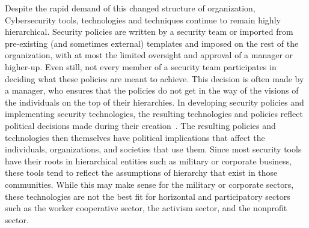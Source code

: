 
Despite the rapid demand of this changed structure of organization, 
Cybersecurity tools, technologies and techniques continue to remain highly 
hierarchical. Security policies are written by a security team or imported from
pre-existing (and sometimes external) templates and imposed on the rest of the
organization, with at most the limited oversight and approval of a manager or
higher-up. Even still, not every member of a security team participates
in deciding what these policies are meant to achieve. This decision is often
made by a manager, who ensures that the policies do not get in the way of the
visions of the individuals on the top of their hierarchies. In developing
security policies and implementing security technologies, the resulting
technologies and policies reflect political decisions made during their
creation~\cite{winner1980artifacts}. The resulting policies and technologies
then themselves have political implications that affect the individuals,
organizations, and societies that use them. Since most security tools have their
roots in hierarchical entities such as military or corporate business, these
tools tend to reflect the assumptions of hierarchy that exist in those
communities. While this may make sense for the military or corporate sectors,
these technologies are not the best fit for horizontal and participatory sectors
such as the worker cooperative sector, the activism sector, and the nonprofit
sector.

